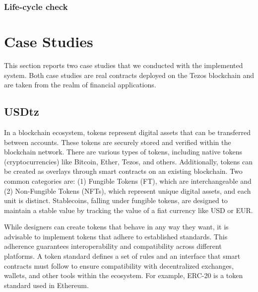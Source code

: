 \documentclass[a4paper,USenglish,cleveref, autoref, thm-restate]{lipics-v2021}
\makeatletter
\newcommand\atha{\todo[author={@Ha},inline]}
\makeatother
\begin{document}
\subsubsection{Life-cycle check}
\label{sec:life-cycle-check}
\atha{To be completed}

\section{Case Studies}
\label{sec:case-stud-subs}

This section reports two case studies that we conducted with the
implemented system. Both case studies are real contracts deployed on
the Tezos blockchain and are taken from the realm of financial
applications. 

\subsection{USDtz}
\label{sec:usdtz}

In a blockchain ecosystem, tokens represent digital assets that can be
transferred between accounts. These tokens are securely stored and
verified within the blockchain network. There are various types of
tokens, including native tokens (cryptocurrencies) like Bitcoin,
Ether, Tezos, and others. Additionally, tokens can be created as
overlays through smart contracts on an existing blockchain. Two common
categories are: (1) Fungible Tokens (FT), which are interchangeable
and (2) Non-Fungible Tokens (NFTs), which represent unique digital
assets, and each unit is distinct. Stablecoins, falling under fungible
tokens, are designed to maintain a stable value by tracking the value
of a fiat currency like USD or EUR.
\atha{add citations!}

While designers can create tokens that behave in any way they want, it
is advisable to implement tokens that adhere to established standards.
This adherence guarantees interoperability and compatibility across
different platforms. A token standard defines a set of rules and an
interface that smart contracts must follow to ensure compatibility
with decentralized exchanges, wallets, and other tools within the
ecosystem. For example, ERC-20 is a token standard used in Ethereum.  
\end{document}
